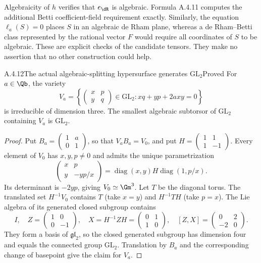 Algebraicity of $h$ verifies that $e_{\dR}$ is algebraic. Formula A.4.11 computes the additional Betti coefficient-field requirement exactly. Similarly, the equation $\ell_a(S)=0$ places $S$ in an algebraic de Rham plane, whereas a de Rham--Betti class represented by the rational vector $F$ would require all coordinates of $S$ to be algebraic. These are explicit checks of the candidate tensors. They make no assertion that no other construction could help.

\begin{result}{A.4.12}{The actual algebraic-splitting hypersurface generates $\mathrm{GL}_2$}{Proved}
For $a\in\Qb$, the variety
\[
 V_a=\left\{\begin{pmatrix}x&p\\y&q\end{pmatrix}\in\mathrm{GL}_2:
 xq+yp+2axy=0\right\}
\]
is irreducible of dimension three. The smallest algebraic subtorsor of $\mathrm{GL}_2$ containing $V_a$ is $\mathrm{GL}_2$.
\end{result}
\begin{proof}
Put $B_a=\left(\begin{smallmatrix}1&a\\0&1\end{smallmatrix}\right)$, so that $V_aB_a=V_0$, and put $H=\left(\begin{smallmatrix}1&1\\1&-1\end{smallmatrix}\right)$. Every element of $V_0$ has $x,y,p\ne0$ and admits the unique parametrization
\[
 \begin{pmatrix}x&p\\y&-yp/x\end{pmatrix}
 =\operatorname{diag}(x,y)H\operatorname{diag}(1,p/x).
\]
Its determinant is $-2yp$, giving $V_0\simeq\Gm^3$. Let $T$ be the diagonal torus. The translated set $H^{-1}V_0$ contains $T$ (take $x=y$) and $H^{-1}TH$ (take $p=x$). The Lie algebra of its generated closed subgroup contains
\[
 I,\quad Z=\begin{pmatrix}1&0\\0&-1\end{pmatrix},\quad
 X=H^{-1}ZH=\begin{pmatrix}0&1\\1&0\end{pmatrix},\quad
 [Z,X]=\begin{pmatrix}0&2\\-2&0\end{pmatrix}.
\]
They form a basis of $\mathfrak{gl}_2$, so the closed generated subgroup has dimension four and equals the connected group $\mathrm{GL}_2$. Translation by $B_a$ and the corresponding change of basepoint give the claim for $V_a$.
\end{proof}

